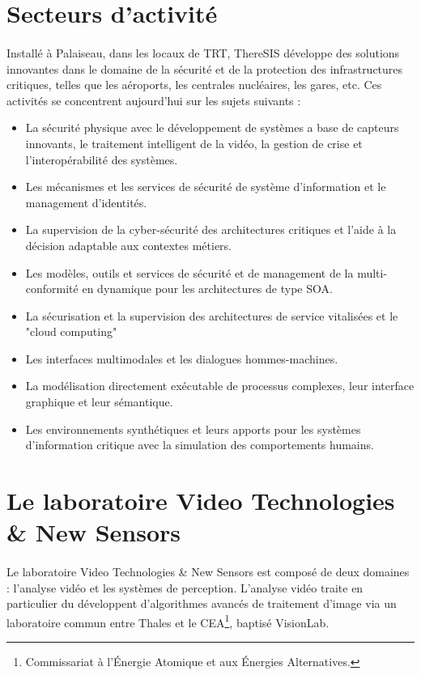 \section{Secteurs d’activit\'e}

\paragraph{} Install\'e à Palaiseau, dans les locaux de TRT, ThereSIS d\'eveloppe des solutions innovantes dans le domaine de la s\'ecurit\'e et de la protection des infrastructures critiques, telles que les a\'eroports, les centrales nucl\'eaires, les gares, etc. Ces activit\'es se concentrent aujourd’hui sur les sujets suivants :

\begin{itemize}
  \item La s\'ecurit\'e physique avec le d\'eveloppement de systèmes a base de capteurs innovants, le traitement intelligent de la vid\'eo, la gestion de crise et l’interop\'erabilit\'e des systèmes.
  \item Les m\'ecanismes et les services de s\'ecurit\'e de système d’information et le management d’identit\'es.
  \item La supervision de la cyber-s\'ecurit\'e des architectures critiques et l’aide à la d\'ecision adaptable aux contextes m\'etiers.
  \item Les modèles, outils et services de s\'ecurit\'e et de management de la multi-conformit\'e en dynamique pour les architectures de type SOA.
  \item La s\'ecurisation et la supervision des architectures de service vitalis\'ees et le "cloud computing"
  \item Les interfaces multimodales et les dialogues hommes-machines.
  \item La mod\'elisation directement ex\'ecutable de processus complexes, leur interface graphique et leur s\'emantique.
  \item Les environnements synth\'etiques et leurs apports pour les systèmes d’information critique avec la simulation des comportements humains.
\end{itemize}

\section{Le laboratoire Video Technologies \& New Sensors}

\paragraph{} Le laboratoire Video Technologies \& New Sensors est compos\'e de deux domaines : l'analyse vid\'eo et les syst\`emes de perception. L'analyse vid\'eo traite en particulier du d\'eveloppent d'algorithmes avanc\'es de traitement d'image via un laboratoire commun entre Thales et le CEA\footnote{Commissariat \`a l'\'Energie Atomique et aux \'Energies Alternatives.}, baptis\'e VisionLab.
